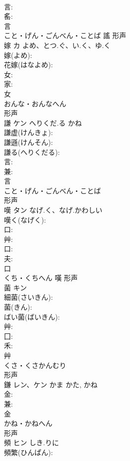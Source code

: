\documentclass[8pt]{extreport}
\begin{document}
\begin{CJK}{UTF8}{min}
\\	言: 
\\	䍃: 
\\	言	
\\	こと・げん・ごんべん・ことば	謠	形声 
\\	嫁	カ	よめ、とつ.ぐ、い.く、ゆ.く		
\\	嫁(よめ): 
\\	花嫁(はなよめ): 
\\	女: 
\\	家: 
\\	女	
\\	おんな・おんなへん	
\\	形声 
\\	謙	ケン	へりくだ.る	かね	
\\	謙虚(けんきょ): 
\\	謙遜(けんそん): 
\\	謙る(へりくだる): 
\\	言: 
\\	兼: 
\\	言	
\\	こと・げん・ごんべん・ことば	
\\	形声 
\\	嘆	タン	なげ.く、なげ.かわしい		
\\	嘆く(なげく): 
\\	口: 
\\	艸: 
\\	口: 
\\	夫: 
\\	口	
\\	くち・くちへん	嘆	形声 
\\	菌	キン			
\\	細菌(さいきん): 
\\	菌(きん): 
\\	ばい菌(ばいきん): 
\\	艸: 
\\	囗: 
\\	禾: 
\\	艸	
\\	くさ・くさかんむり	
\\	形声 
\\	鎌	レン、ケン	かま	かた, かね	
\\	金: 
\\	兼: 
\\	金	
\\	かね・かねへん	
\\	形声 
\\	頻	ヒン	しき.りに		
\\	頻繁(ひんぱん): 

\end{CJK}
\end{document}
